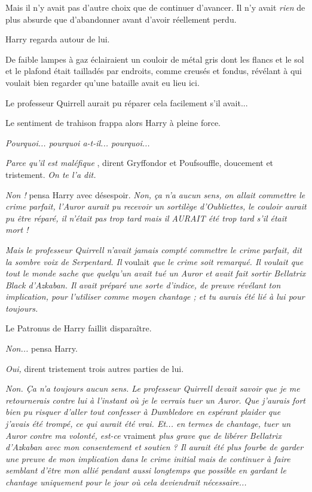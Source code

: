 Mais il n'y avait pas d'autre choix que de continuer d'avancer. Il n'y avait \emph{rien}  de plus absurde que d'abandonner avant d'avoir réellement perdu.

Harry regarda autour de lui.

De faible lampes à gaz éclairaient un couloir de métal gris dont les flancs et le sol et le plafond était tailladés par endroits, comme creusés et fondus, révélant à qui voulait bien regarder qu'une bataille avait eu lieu ici.

Le professeur Quirrell aurait pu réparer cela facilement s'il avait...

Le sentiment de trahison frappa alors Harry à pleine force.

\emph{Pourquoi... pourquoi a-t-il... pourquoi...} 

\emph{Parce qu'il est maléfique} , dirent Gryffondor et Poufsouffle, doucement et tristement. \emph{On te l'a dit.} 

\emph{Non ! } pensa Harry avec désespoir. \emph{Non, ça n'a aucun sens, on allait commettre le crime parfait, l'Auror aurait pu recevoir un sortilège d'Oubliettes, le couloir aurait pu être réparé, il n'était pas trop tard mais il AURAIT été trop tard s'il était mort !} 

\emph{Mais le professeur Quirrell n'avait jamais compté commettre le crime parfait, dit la sombre voix de Serpentard. Il } voulait \emph{que le crime soit remarqué. Il voulait que tout le monde sache que quelqu'un avait tué un Auror et avait fait sortir Bellatrix Black d'Azkaban. Il avait préparé une sorte d'indice, de preuve révélant ton implication, pour l'utiliser comme moyen chantage ; et tu aurais été lié à lui pour toujours.} 

Le Patronus de Harry faillit disparaître.

\emph{Non...}  pensa Harry.

\emph{Oui,}  dirent tristement trois autres parties de lui.

\emph{Non. Ça n'a toujours aucun sens. Le professeur Quirrell devait savoir que je me retournerais contre lui à l'instant où je le verrais tuer un Auror. Que j'aurais fort bien pu risquer d'aller tout confesser à Dumbledore en espérant plaider que j'avais été trompé, ce qui aurait été vrai. Et... en termes de chantage, tuer un Auror contre ma volonté, est-ce } vraiment\emph{ plus grave que de libérer Bellatrix d'Azkaban avec mon consentement et soutien ? Il aurait été plus fourbe de garder une preuve de mon implication dans le crime initial mais de continuer à faire semblant d'être mon allié pendant aussi longtemps que possible en gardant le chantage uniquement pour le jour où cela deviendrait nécessaire...} 

